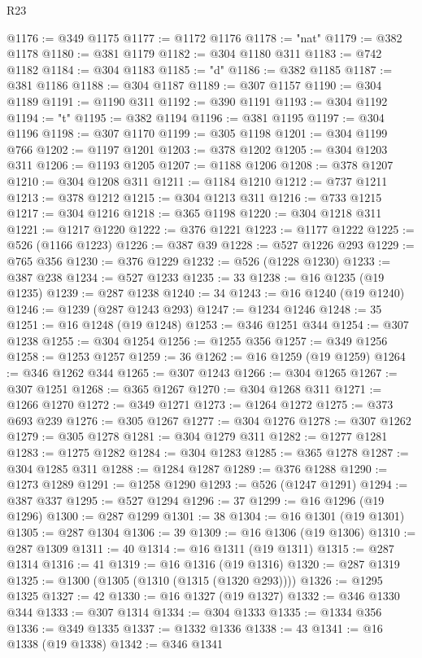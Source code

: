 \begin{lexlean}{R23}
\begin{coremodule}
@1176 := @349 @1175
@1177 := @1172 @1176
@1178 := "nat"
@1179 := @382 @1178
@1180 := @381 @1179
@1182 := @304 @1180 @311
@1183 := @742 @1182
@1184 := @304 @1183
@1185 := "d"
@1186 := @382 @1185
@1187 := @381 @1186
@1188 := @304 @1187
@1189 := @307 @1157
@1190 := @304 @1189
@1191 := @1190 @311
@1192 := @390 @1191
@1193 := @304 @1192
@1194 := "t"
@1195 := @382 @1194
@1196 := @381 @1195
@1197 := @304 @1196
@1198 := @307 @1170
@1199 := @305 @1198
@1201 := @304 @1199 @766
@1202 := @1197 @1201
@1203 := @378 @1202
@1205 := @304 @1203 @311
@1206 := @1193 @1205
@1207 := @1188 @1206
@1208 := @378 @1207
@1210 := @304 @1208 @311
@1211 := @1184 @1210
@1212 := @737 @1211
@1213 := @378 @1212
@1215 := @304 @1213 @311
@1216 := @733 @1215
@1217 := @304 @1216
@1218 := @365 @1198
@1220 := @304 @1218 @311
@1221 := @1217 @1220
@1222 := @376 @1221
@1223 := @1177 @1222
@1225 := @526 (@1166 @1223)
@1226 := @387 @39
@1228 := @527 @1226 @293
@1229 := @765 @356
@1230 := @376 @1229
@1232 := @526 (@1228 @1230)
@1233 := @387 @238
@1234 := @527 @1233
@1235 := 33
@1238 := @16 @1235 (@19 @1235)
@1239 := @287 @1238
@1240 := 34
@1243 := @16 @1240 (@19 @1240)
@1246 := @1239 (@287 @1243 @293)
@1247 := @1234 @1246
@1248 := 35
@1251 := @16 @1248 (@19 @1248)
@1253 := @346 @1251 @344
@1254 := @307 @1238
@1255 := @304 @1254
@1256 := @1255 @356
@1257 := @349 @1256
@1258 := @1253 @1257
@1259 := 36
@1262 := @16 @1259 (@19 @1259)
@1264 := @346 @1262 @344
@1265 := @307 @1243
@1266 := @304 @1265
@1267 := @307 @1251
@1268 := @365 @1267
@1270 := @304 @1268 @311
@1271 := @1266 @1270
@1272 := @349 @1271
@1273 := @1264 @1272
@1275 := @373 @693 @239
@1276 := @305 @1267
@1277 := @304 @1276
@1278 := @307 @1262
@1279 := @305 @1278
@1281 := @304 @1279 @311
@1282 := @1277 @1281
@1283 := @1275 @1282
@1284 := @304 @1283
@1285 := @365 @1278
@1287 := @304 @1285 @311
@1288 := @1284 @1287
@1289 := @376 @1288
@1290 := @1273 @1289
@1291 := @1258 @1290
@1293 := @526 (@1247 @1291)
@1294 := @387 @337
@1295 := @527 @1294
@1296 := 37
@1299 := @16 @1296 (@19 @1296)
@1300 := @287 @1299
@1301 := 38
@1304 := @16 @1301 (@19 @1301)
@1305 := @287 @1304
@1306 := 39
@1309 := @16 @1306 (@19 @1306)
@1310 := @287 @1309
@1311 := 40
@1314 := @16 @1311 (@19 @1311)
@1315 := @287 @1314
@1316 := 41
@1319 := @16 @1316 (@19 @1316)
@1320 := @287 @1319
@1325 := @1300 (@1305 (@1310 (@1315 (@1320 @293))))
@1326 := @1295 @1325
@1327 := 42
@1330 := @16 @1327 (@19 @1327)
@1332 := @346 @1330 @344
@1333 := @307 @1314
@1334 := @304 @1333
@1335 := @1334 @356
@1336 := @349 @1335
@1337 := @1332 @1336
@1338 := 43
@1341 := @16 @1338 (@19 @1338)
@1342 := @346 @1341

\end{coremodule}
\end{lexlean}
